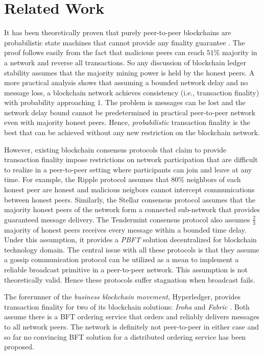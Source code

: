\section{Related Work}
\label{s-related-work}
It has been theoretically proven that purely peer-to-peer blockchains are probabilistic state machines that cannot provide any finality guarantee \cite{7756226}. The proof follows easily from the fact that malicious peers can reach $51\%$ majority in a network and reverse all transactions. So any discussion of blockchain ledger stability assumes that the majority mining power is held by the honest peers. A more practical analysis \cite{10.1007/978-3-319-56614-6_22} shows that assuming a bounded network delay and no message loss, a blockchain network achieves consistency (i.e., transaction finality) with probability approaching $1$. The problem is messages can be lost and the network delay bound cannot be predetermined in practical peer-to-peer network even with majority honest peers. Hence, \textit{probabilistic} transaction finality is the best that can be achieved without any new restriction on the blockchain network.

However, existing blockchain consensus protocols that claim to provide transaction finality impose restrictions on network participation that are difficult to realize in a peer-to-peer setting where participants can join and leave at any time. For example, the Ripple \cite{David2014TheRP} protocol assumes that $80\%$ neighbors of each honest peer are honest and malicious neigbors cannot intercept communications between honest peers. Similarly, the Stellar consensus protocol \cite{thestellar} assumes that the majority honest peers of the network form a connected sub-network that provides guaranteed message delivery. The Tendermint consensus protocol \cite{Buchman2018TheLG} also assumes $\frac{2}{3}$ majority of honest peers receives every message within a bounded time delay. Under this assumption, it provides a \textit{PBFT} \cite{Castro:1999:PBF:296806.296824} solution decentralized for blockchain technology domain. The central issue with all these protocols is that they assume a gossip communication protocol \cite{gossip} can be utilized as a mean to implement a reliable broadcast primitive \cite{Jalote:1994:FTD:179250} in a peer-to-peer network. This assumption is not theoretically valid. Hence these protocols suffer stagnation when broadcast fails.          

The forerunner of the \textit{business blockchain movement}, Hyperledger, provides transaction finality for two of its blockchain solutions: \textit{Iroha} \cite{yac} and \textit{Fabric} \cite{patent:20180150799}. Both assume there is a BFT ordering service that orders and reliably delivers messages to all network peers. The network is definitely not peer-to-peer in either case and so far no convincing BFT solution for a distributed ordering service has been proposed. 

